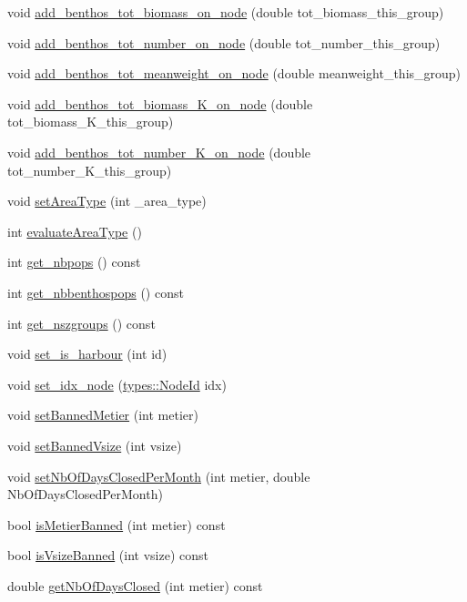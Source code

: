 \begin{DoxyCompactItemize}
\item 
void \mbox{\hyperlink{class_node_a2b82fcf3df254fcce2e1cba1f78c2d14}{add\+\_\+benthos\+\_\+tot\+\_\+biomass\+\_\+on\+\_\+node}} (double tot\+\_\+biomass\+\_\+this\+\_\+group)
\item 
void \mbox{\hyperlink{class_node_ae622072140d53b330aec6c23f9a611d3}{add\+\_\+benthos\+\_\+tot\+\_\+number\+\_\+on\+\_\+node}} (double tot\+\_\+number\+\_\+this\+\_\+group)
\item 
void \mbox{\hyperlink{class_node_a3abc9e346868f6d2e92ad7fc66c35661}{add\+\_\+benthos\+\_\+tot\+\_\+meanweight\+\_\+on\+\_\+node}} (double meanweight\+\_\+this\+\_\+group)
\item 
void \mbox{\hyperlink{class_node_a385e6573c83fa6b2343090b6684a3d96}{add\+\_\+benthos\+\_\+tot\+\_\+biomass\+\_\+\+K\+\_\+on\+\_\+node}} (double tot\+\_\+biomass\+\_\+\+K\+\_\+this\+\_\+group)
\item 
void \mbox{\hyperlink{class_node_a5f6087632a0fad4b54979b03600dfb80}{add\+\_\+benthos\+\_\+tot\+\_\+number\+\_\+\+K\+\_\+on\+\_\+node}} (double tot\+\_\+number\+\_\+\+K\+\_\+this\+\_\+group)
\item 
void \mbox{\hyperlink{class_node_a6cc325f90a8419a45a43d2bdcb939d2a}{set\+Area\+Type}} (int \+\_\+area\+\_\+type)
\item 
int \mbox{\hyperlink{class_node_a59840b051f4d08638ea0a1e9760f7434}{evaluate\+Area\+Type}} ()
\item 
int \mbox{\hyperlink{class_node_ab1065def4c8f5a597d377ac21b8c5e49}{get\+\_\+nbpops}} () const
\item 
int \mbox{\hyperlink{class_node_a74c590ed71d8d3ca60abbccddebf0d83}{get\+\_\+nbbenthospops}} () const
\item 
int \mbox{\hyperlink{class_node_a156883cb765d9d1d7a66defcdd90a309}{get\+\_\+nszgroups}} () const
\item 
void \mbox{\hyperlink{class_node_a5200fc9b871d1dc60b4106fabd08a202}{set\+\_\+is\+\_\+harbour}} (int id)
\item 
void \mbox{\hyperlink{class_node_a39fc0eda83ea54cbf4aeb669ff5f49ae}{set\+\_\+idx\+\_\+node}} (\mbox{\hyperlink{classtypes_1_1_node_id}{types\+::\+Node\+Id}} idx)
\item 
void \mbox{\hyperlink{class_node_ac216385365b6eef9ee9c93a0ef727901}{set\+Banned\+Metier}} (int metier)
\item 
void \mbox{\hyperlink{class_node_a448a5baf8c5f91cef737214e9c06257f}{set\+Banned\+Vsize}} (int vsize)
\item 
void \mbox{\hyperlink{class_node_a1da66a05b9e6ff86ada43f91bdc8b3be}{set\+Nb\+Of\+Days\+Closed\+Per\+Month}} (int metier, double Nb\+Of\+Days\+Closed\+Per\+Month)
\item 
bool \mbox{\hyperlink{class_node_a559e525ebf950f74b173c59ef00d2f1a}{is\+Metier\+Banned}} (int metier) const
\item 
bool \mbox{\hyperlink{class_node_abe46b40cd4f6cc7d2aec9f5194a25a39}{is\+Vsize\+Banned}} (int vsize) const
\item 
double \mbox{\hyperlink{class_node_ad1f398810cb1ab0acca6e9d98fda8231}{get\+Nb\+Of\+Days\+Closed}} (int metier) const
\end{DoxyCompactItemize}

